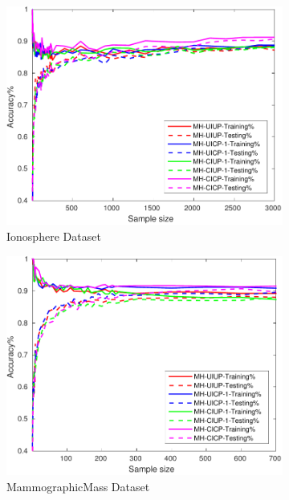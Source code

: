 \begin{figure}[ht]
\begin{subfigure}[b]{0.3\textwidth}
		\centering
  	\includegraphics[width=\textwidth]{figs/PLPTF/Trees/IonosphereDownsampledFurther_Trees_MH.pdf}
  	\caption{Ionosphere Dataset}
		\label{fig:I2}
	\end{subfigure}
  \begin{subfigure}[b]{0.3\textwidth}
		\centering
  	\includegraphics[width=\textwidth]{figs/PLPTF/Trees/MammographicMassDownsampled_Trees_MH.pdf}
  	\caption{MammographicMass Dataset}
		\label{fig:Mam2}
	\end{subfigure}
	\\
  \begin{subfigure}[b]{0.3\textwidth}

\end{subfigure}
\end{figure}

